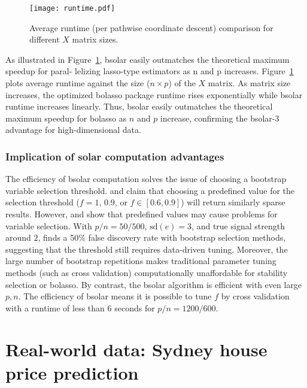 \documentclass[11pt,review,authoryear]{elsarticle}
\begin{document}
\begin{figure}[ht]
  \centering
  \texttt{[image: runtime.pdf]}
  \caption{Average runtime (per pathwise coordinate descent) comparison for different $X$ matrix sizes.}
  \label{fig:runtime}
\end{figure}

As illustrated in Figure~\ref{fig:runtime}, bsolar easily outmatches the theoretical maximum speedup for paral- lelizing lasso-type estimators as n and p increases. Figure~\ref{fig:runtime} plots average runtime against the size ($n \times p$) of the $X$ matrix. As matrix size increases, the optimized bolasso package runtime rises exponentially while bsolar runtime increases linearly. Thus, bsolar easily outmatches the theoretical maximum speedup for bolasso as $n$ and $p$ increase, confirming the bsolar-3 advantage for high-dimensional data.

\subsubsection{Implication of solar computation advantages}

The efficiency of bsolar computation solves the issue of choosing a bootstrap variable selection threshold. \citet{bach2008bolasso} and \citet{meinshausen2010stability} claim that choosing a predefined value for the selection threshold ($f=1$, $0.9$, or $f\in\left[0.6,0.9\right]$) will return similarly sparse results. However, \citet{bach2008bolasso} and \citet{huang2014stat} show that predefined values may cause problems for variable selection. With $p/n=50/500$, $\mathrm{sd}(e)=3$, and true signal strength around $2$, \citet{huang2014stat} finds a 50\% false discovery rate with bootstrap selection methods, suggesting that the threshold still requires data-driven tuning. Moreover, the large number of bootstrap repetitions makes traditional parameter tuning methods (such as cross validation) computationally unaffordable for stability selection or bolasso. By contrast, the bsolar algorithm is efficient with even large $p,n$. The efficiency of bsolar means it is possible to tune $f$ by cross validation with a runtime of less than $6$ seconds for $p/n=1200/600$.

\section{Real-world data: Sydney house price prediction\label{section:application}}
\end{document}
